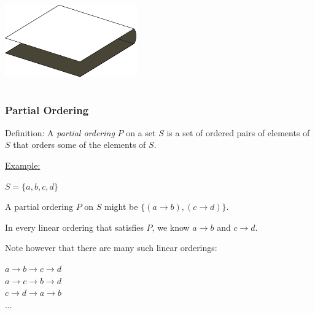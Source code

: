 \documentclass{beamer}
\begin{document}
\begin{frame}
\begin{columns}[c]
\includegraphics[width=.9\textwidth]{sam_images/checkerboard-3d.pdf}

\end{columns}

\end{frame}



\begin{frame}
\frametitle{Partial Ordering}
\begin{block}{Definition:}
A \textit{partial ordering} $P$ on a set $S$ is a set of ordered pairs of elements of $S$ that orders some of the elements of $S$.
\end{block}

\medskip

\underline{Example:} \\

\smallskip
\pause

$S = \{a, b, c, d\}$ \\

\smallskip
\pause

A partial ordering $P$ on $S$ might be $\{(a\rightarrow b),(c\rightarrow d)\}$. \\

\smallskip
\pause

In every linear ordering that satisfies $P$, we know $a\rightarrow b$ and $c\rightarrow d$. \\

\smallskip
\pause

Note however that there are many such linear orderings: \\

\smallskip
\pause

$a\rightarrow b\rightarrow c\rightarrow d$ \\
\pause
$a\rightarrow c\rightarrow b\rightarrow d$ \\
$c\rightarrow d \rightarrow a \rightarrow b$ \\
...

\end{frame}
\end{document}
